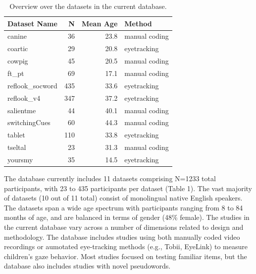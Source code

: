\documentclass[10pt, letterpaper]{article}
\begin{document}
\begin{table}[H]
\centering
\begingroup\fontsize{9pt}{10pt}\selectfont
\begin{tabular}{lrrl}
  \hline
Dataset Name & N & Mean Age & Method \\ 
  \hline
canine & 36 & 23.8 & manual coding \\ 
  coartic & 29 & 20.8 & eyetracking \\ 
  cowpig & 45 & 20.5 & manual coding \\ 
  ft\_pt & 69 & 17.1 & manual coding \\ 
  reflook\_socword & 435 & 33.6 & eyetracking \\ 
  reflook\_v4 & 347 & 37.2 & eyetracking \\ 
  salientme & 44 & 40.1 & manual coding \\ 
  switchingCues & 60 & 44.3 & manual coding \\ 
  tablet & 110 & 33.8 & eyetracking \\ 
  tseltal & 23 & 31.3 & manual coding \\ 
  yoursmy & 35 & 14.5 & eyetracking \\ 
   \hline
\end{tabular}
\endgroup
\caption{Overview over the datasets in the current database.} 
\end{table}

The database currently includes 11 datasets comprising N=1233 total
participants, with 23 to 435 participants per dataset (Table 1). The
vast majority of datasets (10 out of 11 total) consist of monolingual
native English speakers. The datasets span a wide age spectrum with
participants ranging from 8 to 84 months of age, and are balanced in
terms of gender (48\% female). The studies in the current database vary
across a number of dimensions related to design and methodology. The
database includes studies using both manually coded video recordings or
aumotated eye-tracking methods (e.g., Tobii, EyeLink) to measure
children's gaze behavior. Most studies focused on testing familiar
items, but the database also includes studies with novel pseudowords.
\end{document}
